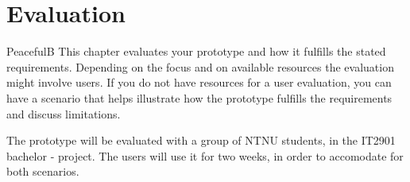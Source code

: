 \chapter{Evaluation}
PeacefulB
This chapter evaluates your prototype and how it fulfills the
stated requirements. Depending on the focus and on available resources
the evaluation might involve users. If you do not have resources for a user
evaluation, you can have a scenario that helps illustrate how the prototype
fulfills the requirements and discuss limitations.

The prototype will be evaluated with a group of NTNU students, in the IT2901 bachelor - project. The users will use it for two weeks, in order to accomodate for both scenarios.